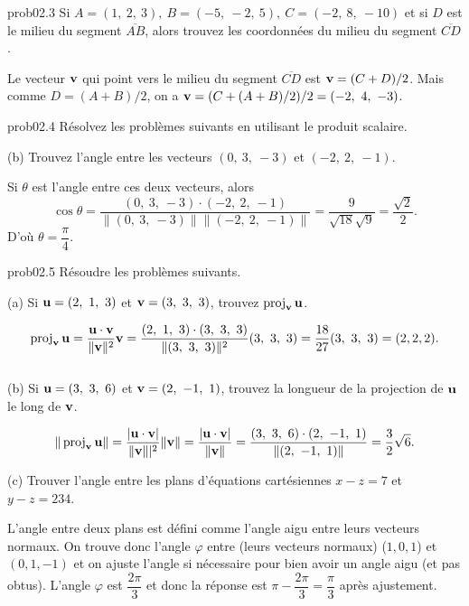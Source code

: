 

\begin{sol}{prob02.3} Si $A=(1,\ 2,\ 3),\ B=(-5,\ -2,\ 5),\ C=(-2,\ 8,\ -10)$ 
et si $D$ est le milieu du segment $\overline{AB}$, alors trouvez les coordonnées du milieu du segment $\overline{CD}$.

\soln Le vecteur $\mathbf{v}$ qui point vers le milieu du segment $\overline{CD}$ est $\mathbf{v}=(C+D)/2$. Mais comme $D=(A+B)/2$, on a 
$\vv=(C+(A+B)/2)/2=(-2,\ 4,\ -3)$.
\medskip

\end{sol} 

\bigskip
\begin{sol}{prob02.4} Résolvez les problèmes suivants en utilisant le produit scalaire.


\medskip
(b) Trouvez l'angle entre les vecteurs $ (0,\ 3,\ -3)$ et $ (-2,\ 2,\ -1)$.  \medskip

\soln Si $\theta$ est l'angle entre ces deux vecteurs, alors $$\cos \theta=\dfrac{(0,\ 3,\ -3)\cdot(-2,\ 2,\ -1)}{\| (0,\ 3,\ -3)\| \| (-2,\ 2,\ -1)\|}=\dfrac{9}{\sqrt{18}\sqrt{9}}=\dfrac{\sqrt{2}}{2}.$$ D'o\`u $\theta= \dfrac{\pi}{4}$.
\medskip


\end{sol} 

\bigskip
\begin{sol}{prob02.5}  Résoudre les problèmes suivants. \medskip


(a) Si $\mathbf{u}=(2,\ 1,\ 3)$ et $\mathbf{v}=(3,\ 3,\ 3)$, trouvez
 $\operatorname{proj}_{\mathbf{v}}{\mathbf{u}}$. 

\soln $$\proj_{\vv}{\uu}=\dfrac{\uu\cdot \vv}{\|\vv\|^2}\vv=\dfrac{(2,\ 1,\ 3)\cdot (3,\ 3,\ 3)}{\|(3,\ 3,\ 3)\|^2}(3,\ 3,\ 3)=\dfrac{18}{27}(3,\ 3,\ 3)=(2,2,2).$$ \medskip
\\


(b) Si $\mathbf{u}=(3,\ 3,\ 6)$ et $\mathbf{v}=(2,\ -1,\ 1)$, trouvez 
la longueur de la projection de $\mathbf{u}$ le long de $\mathbf{v}$. 

\soln
$$\|\proj_{\vv}{\uu}\|=\dfrac{|\uu\cdot \vv|}{\|\vv\||^2}\|\vv\|=\dfrac{|\uu\cdot \vv|}{\|\vv\|}=\dfrac{(3,\ 3,\ 6)\cdot (2,\ -1,\ 1)}{\|(2,\ -1,\ 1)\|}=\dfrac{ 3}{ 2}\sqrt{6}.$$
 
 \medskip
(c) Trouver l'angle entre les plans d'équations cartésiennes $x-z=7$ et $y-z=234$.

\soln L'angle entre deux plans est défini comme l'angle aigu entre leurs vecteurs normaux. On trouve donc l'angle $\varphi$ entre (leurs vecteurs normaux) ($1,0,1$) et $(0,1,-1)$ et on ajuste l'angle si nécessaire pour bien avoir un angle aigu (et pas obtus). L'angle $\varphi$ est $\dfrac{2\pi}{3}$ et donc la réponse est $\pi -\dfrac{2\pi}{3}=\dfrac{\pi}{3}$ après ajustement. 

\medskip
 
  
\end{sol}